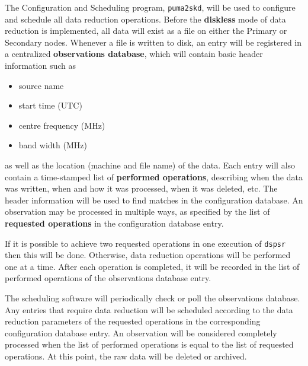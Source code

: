 The Configuration and Scheduling program, {\tt puma2skd}, will be used
to configure and schedule all data reduction operations.  Before the
{\bf diskless} mode of data reduction is implemented, all data will
exist as a file on either the Primary or Secondary nodes.  Whenever a
file is written to disk, an entry will be registered in a centralized
{\bf observations database}, which will contain basic header
information such as
\begin{itemize}
\item source name
\vspace{-2mm}
\item start time (UTC)
\vspace{-2mm}
\item centre frequency (MHz)
\vspace{-2mm}
\item band width (MHz)
\end{itemize}
as well as the location (machine and file name) of the data.  Each
entry will also contain a time-stamped list of {\bf performed
operations}, describing when the data was written, when and how it was
processed, when it was deleted, etc.  The header information will be
used to find matches in the configuration database.  An observation
may be processed in multiple ways, as specified by the list of {\bf
requested operations} in the configuration database entry.

If it is possible to achieve two requested operations in one execution
of {\tt dspsr} then this will be done.  Otherwise, data reduction
operations will be performed one at a time.  After each operation is
completed, it will be recorded in the list of performed operations of
the observations database entry.

The scheduling software will periodically check or poll the
observations database.  Any entries that require data reduction will
be scheduled according to the data reduction parameters of the
requested operations in the corresponding configuration database
entry.  An observation will be considered completely processed when
the list of performed operations is equal to the list of requested
operations.  At this point, the raw data will be deleted or archived.
